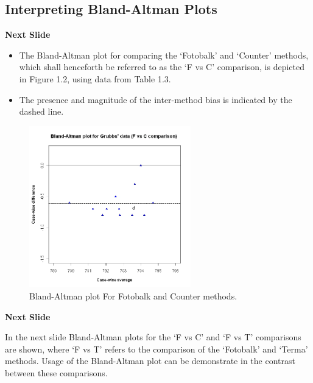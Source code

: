 \documentclass[compress]{beamer}        %
\begin{document}
\subsection{Interpreting Bland-Altman Plots}


\begin{frame}
\textbf{Next Slide}
\begin{itemize}
\item The Bland-Altman plot for comparing the `Fotobalk' and `Counter'
methods, which shall henceforth be referred to as the `F vs C'
comparison,  is depicted in Figure 1.2, using data from Table 1.3.
\item The presence and magnitude of the inter-method bias is indicated
by the dashed line.
\end{itemize}
\end{frame}
\begin{frame}
\begin{figure}[h!]
\begin{center}
  \includegraphics[width=70mm]{GrubbsBAplot-noLOA.jpeg}
  \caption{Bland-Altman plot For Fotobalk and Counter methods.}\label{GrubbsBA-noLOA}
\end{center}
\end{figure}
\end{frame}
\begin{frame}
\textbf{Next Slide}

In the next slide Bland-Altman plots for the `F vs C' and `F vs T'
comparisons are shown, where `F vs T' refers to the comparison of
the `Fotobalk' and `Terma' methods. Usage of the Bland-Altman plot
can be demonstrate in the contrast between these comparisons.
\end{frame}
\end{document}
